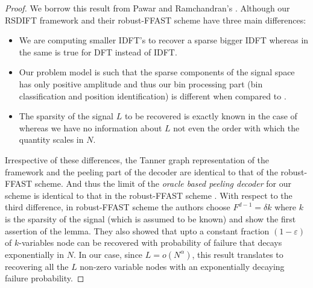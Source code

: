 \begin{proof}
We borrow this result from Pawar and Ramchandran's \cite{pawar2014robust}. Although our RSDIFT framework and their robust-FFAST scheme have three main differences:
\begin{itemize}
\item We are computing smaller IDFT's to recover a sparse bigger IDFT whereas in \cite{pawar2014robust} the same is true for DFT instead of IDFT.
\item Our problem model is such that the sparse components of the signal space has only positive amplitude and thus our bin processing part (bin classification and position identification) is different when compared to \cite{pawar2014robust}.
\item The sparsity of the signal $L$ to be recovered is exactly known in the case of \cite{pawar2014robust} whereas we have no information  about $L$ not even the order with which the quantity scales in $N$.
\end{itemize}
Irrespective of these differences, the Tanner graph representation of the framework and the peeling part of the decoder are identical to that of the robust-FFAST scheme. And thus the limit of the {\it oracle based peeling decoder} for our scheme is identical to that in the robust-FFAST scheme \cite{pawar2014robust}.  With respect to the third difference, in robust-FFAST scheme the authors choose $F^{d-1}=\delta k$ where $k$ is the sparsity of the signal (which is assumed to be known) and show the first assertion of the lemma. They also showed that upto a constant fraction $(1-\varepsilon)$ of $k$-variables node can be recovered with probability of failure that decays exponentially in $N$. In our case, since $L=o(N^{\alpha})$, this result translates to recovering all the $L$ non-zero variable nodes with an exponentially decaying failure  probability.
\end{proof}

